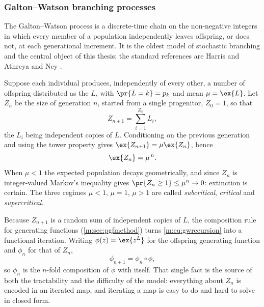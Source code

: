 \subsubsection{Galton--Watson branching processes}
\label{m:sec:gw}

The Galton--Watson process is a discrete-time chain on the non-negative integers in
which every member of a population independently leaves offspring, or does not, at
each generational increment. It is the oldest model of stochastic branching and the
central object of this thesis; the standard references are Harris \cite{Harris1963}
and Athreya and Ney \cite{Athreya1972}.

Suppose each individual produces, independently of every other, a number of
offspring distributed as the \rv{} $L$, with $\pr{L=k}=p_k$ and mean
$\mu=\ex{L}$. Let $Z_n$ be the size of generation $n$, started from a single
progenitor, $Z_0=1$, so that
\begin{equation}
\label{m:eq:gwrecursion}
Z_{n+1} = \sum_{i=1}^{Z_n}L_i ,
\end{equation}
the $L_i$ being independent copies of $L$. Conditioning on the previous generation
and using the tower property gives $\ex{Z_{n+1}} = \mu\ex{Z_n}$, hence
\begin{equation}
\label{m:eq:gwmean}
\ex{Z_n} = \mu^{\,n} .
\end{equation}
When $\mu<1$ the expected population decays geometrically, and since $Z_n$ is
integer-valued Markov's inequality gives $\pr{Z_n\ge1}\le\mu^n\to0$: extinction is
certain. The three regimes $\mu<1$, $\mu=1$, $\mu>1$ are called
\emph{subcritical}, \emph{critical} and \emph{supercritical}.

Because $Z_{n+1}$ is a random sum of independent copies of $L$, the composition
rule for generating functions (\cref{m:sec:pgfmethod}) turns
\cref{m:eq:gwrecursion} into a functional iteration. Writing
$\phi(z)=\ex{z^L}$ for the offspring generating function and $\phi_n$ for that of
$Z_n$,
\begin{equation}
\label{m:eq:gwcomposition}
\phi_{n+1} = \phi_n\circ\phi ,
\end{equation}
so $\phi_n$ is the $n$-fold composition of $\phi$ with itself. That single fact is
the source of both the tractability and the difficulty of the model: everything
about $Z_n$ is encoded in an iterated map, and iterating a map is easy to do and
hard to solve in closed form.

